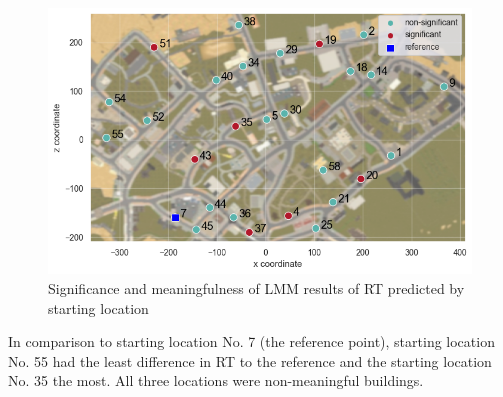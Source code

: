 \begin{figure}[!htb]
	\centering
	\includegraphics[width=150mm]{figures/significance_starting_locations_RT_map_23.png}
	\caption[Significance and meaningfulness (RT predicted by starting location)]{Significance and meaningfulness of LMM results of RT predicted by starting location}
	\label{fig:sig_RT_loc_map}
\end{figure}

In comparison to starting location No. 7 (the reference point), starting location No. 55 had the least difference in RT to the reference and the starting location No. 35 the most. All three locations were non-meaningful buildings.
